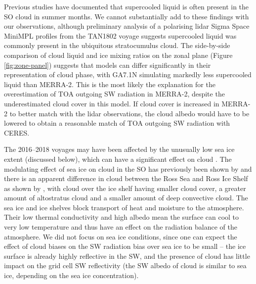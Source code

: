 Previous studies have documented that supercooled liquid is often present in
the SO cloud in summer months. We cannot substantially add to these findings
with our observations, although preliminary analysis of a polarising lidar
Sigma Space MiniMPL profiles from the TAN1802 voyage suggests supercooled
liquid was commonly present in the ubiquitous stratocumulus cloud. The
side-by-side comparison of cloud liquid and ice mixing ratios on the zonal
plane (Figure \ref{fig:zone-panel}) suggests that models can differ
significantly in their representation of cloud phase, with GA7.1N simulating
markedly less supercooled liquid than MERRA-2. This is the most likely
the explanation for the overestimation of TOA outgoing SW radiation in MERRA-2,
despite the underestimated cloud cover in this model. If cloud cover is
increased in MERRA-2 to better match with the lidar observations, the cloud
albedo would have to be lowered to obtain a reasonable match of TOA outgoing SW
radiation with CERES.

The 2016--2018 voyages may have been affected by the unusually low sea ice
extent (discussed below), which can have a significant effect on cloud
\citep{frey2018,taylor2015}. The modulating effect of sea ice on cloud in the
SO has previously been shown by \cite{listowski2018} and there is an apparent
difference in cloud between the Ross Sea and Ross Ice Shelf as shown by
\cite{jolly2018}, with cloud over the ice shelf having smaller cloud cover, a
greater amount of altostratus cloud and a smaller amount of deep convective
cloud. The sea ice and ice shelves block transport of heat and moisture to the
atmosphere. Their low thermal conductivity and high albedo mean the surface can
cool to very low temperature and thus have an effect on the radiation balance
of the atmosphere. We did not focus on sea ice conditions, since one can expect
the effect of cloud biases on the SW radiation bias over sea ice to be small --
the ice surface is already highly reflective in the SW, and the presence of
cloud has little impact on the grid cell SW reflectivity (the SW albedo of
cloud is similar to sea ice, depending on the sea ice concentration).

